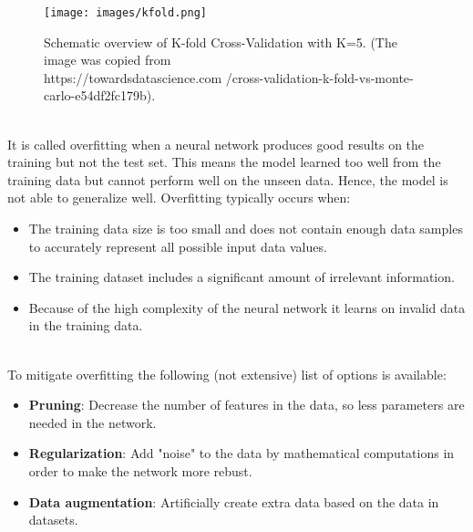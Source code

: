 \begin{figure}[h]
\centering
\captionsetup{justification=centering}
\texttt{[image: images/kfold.png]}
\caption{Schematic overview of K-fold Cross-Validation with K=5. (The image was copied from \\https://towardsdatascience.com /cross-validation-k-fold-vs-monte-carlo-e54df2fc179b).}
\label{imgKFold}
\end{figure}\\

It is called overfitting when a neural network produces good results on the training but not the test set. This means the model learned too well from the training data but cannot perform well on the unseen data. Hence, the model is not able to generalize well. Overfitting typically occurs when:
\begin{itemize}
  \item The training data size is too small and does not contain enough data samples to accurately represent all possible input data values.
  \item The training dataset includes a significant amount of irrelevant information.
  \item Because of the high complexity of the neural network it learns on invalid data in the training data.
\end{itemize}\\

To mitigate overfitting the following (not extensive) list of options is available:
\begin{itemize}
\item \textbf{Pruning}: Decrease the number of features in the data, so less parameters are needed in the network.
\item \textbf{Regularization}: Add "noise" to the data by mathematical computations in order to make the network more rebust.
\item \textbf{Data augmentation}: Artificially create extra data based on the data in datasets.
\end{itemize}




